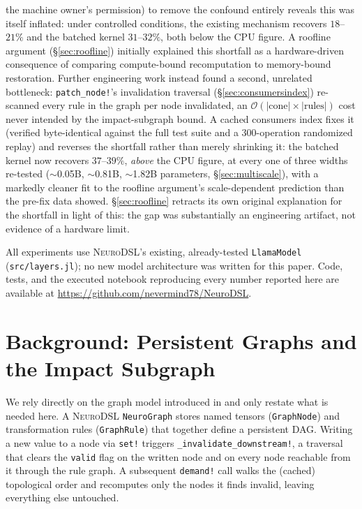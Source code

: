 \documentclass{article}
\begin{document}
\begin{enumerate}
    the machine owner's permission) to remove the confound entirely reveals this was itself
    inflated: under controlled conditions, the existing mechanism recovers $18$--$21\%$ and the
    batched kernel $31$--$32\%$, both below the CPU figure. A roofline argument (\S\ref{sec:roofline})
    initially explained this shortfall as a hardware-driven consequence of comparing compute-bound
    recomputation to memory-bound restoration. Further engineering work instead found a second,
    unrelated bottleneck: \texttt{patch\_node!}'s invalidation traversal (\S\ref{sec:consumersindex})
    re-scanned every rule in the graph per node invalidated, an
    $\mathcal{O}(|\text{cone}|\times|\text{rules}|)$ cost never intended by the impact-subgraph
    bound. A cached consumers index fixes it (verified byte-identical against the full test suite
    and a $300$-operation randomized replay) and reverses the shortfall rather than merely shrinking
    it: the batched kernel now recovers $37$--$39\%$, \emph{above} the CPU figure, at every one of
    three widths re-tested ($\sim$0.05B, $\sim$0.81B, $\sim$1.82B parameters,
    \S\ref{sec:multiscale}), with a markedly cleaner fit to the roofline argument's scale-dependent
    prediction than the pre-fix data showed. \S\ref{sec:roofline} retracts its own original
    explanation for the shortfall in light of this: the gap was substantially an engineering
    artifact, not evidence of a hardware limit.
\end{enumerate}

All experiments use \textsc{NeuroDSL}'s existing, already-tested \texttt{LlamaModel}
(\texttt{src/layers.jl}); no new model architecture was written for this paper. Code, tests, and
the executed notebook reproducing every number reported here are available at
\url{https://github.com/nevermind78/NeuroDSL}.

\section{Background: Persistent Graphs and the Impact Subgraph}
\label{sec:background}

We rely directly on the graph model introduced in \cite{neurodsl} and only restate what is
needed here. A \textsc{NeuroDSL} \texttt{NeuroGraph} stores named tensors (\texttt{GraphNode})
and transformation rules (\texttt{GraphRule}) that together define a persistent DAG. Writing a
new value to a node via \texttt{set!} triggers \texttt{\_invalidate\_downstream!}, a traversal
that clears the \texttt{valid} flag on the written node and on every node reachable from it
through the rule graph. A subsequent \texttt{demand!} call walks the (cached) topological order
and recomputes only the nodes it finds invalid, leaving everything else untouched.
\end{document}
